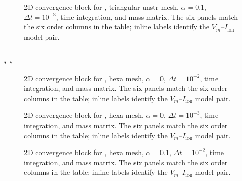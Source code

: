 \begin{figure}[p]
\centering
{}
\caption{2D convergence block for , triangular unstr mesh, $\alpha=0.1$, $\Delta t=10^{-3}$,  time integration, and  mass matrix. The six panels match the six order columns in the table; inline labels identify the $V_m$--$I_{\mathrm{ion}}$ model pair.}
\label{fig:results-2d-diagonaliion-triangular-unstr-alpha-1p0em01-1p0em03}
\end{figure}
\FloatBarrier

\subsubsection{, , }



\begin{figure}[p]
\centering
{}
\caption{2D convergence block for , hexa mesh, $\alpha=0$, $\Delta t=10^{-2}$,  time integration, and  mass matrix. The six panels match the six order columns in the table; inline labels identify the $V_m$--$I_{\mathrm{ion}}$ model pair.}
\label{fig:results-2d-jfnk-hexa-alpha-0p0e00-1p0em02}
\end{figure}
\FloatBarrier

\begin{figure}[p]
\centering
{}
\caption{2D convergence block for , hexa mesh, $\alpha=0$, $\Delta t=10^{-3}$,  time integration, and  mass matrix. The six panels match the six order columns in the table; inline labels identify the $V_m$--$I_{\mathrm{ion}}$ model pair.}
\label{fig:results-2d-jfnk-hexa-alpha-0p0e00-1p0em03}
\end{figure}
\FloatBarrier

\begin{figure}[p]
\centering
{}
\caption{2D convergence block for , hexa mesh, $\alpha=0.1$, $\Delta t=10^{-2}$,  time integration, and  mass matrix. The six panels match the six order columns in the table; inline labels identify the $V_m$--$I_{\mathrm{ion}}$ model pair.}
\label{fig:results-2d-jfnk-hexa-alpha-1p0em01-1p0em02}
\end{figure}
\FloatBarrier

